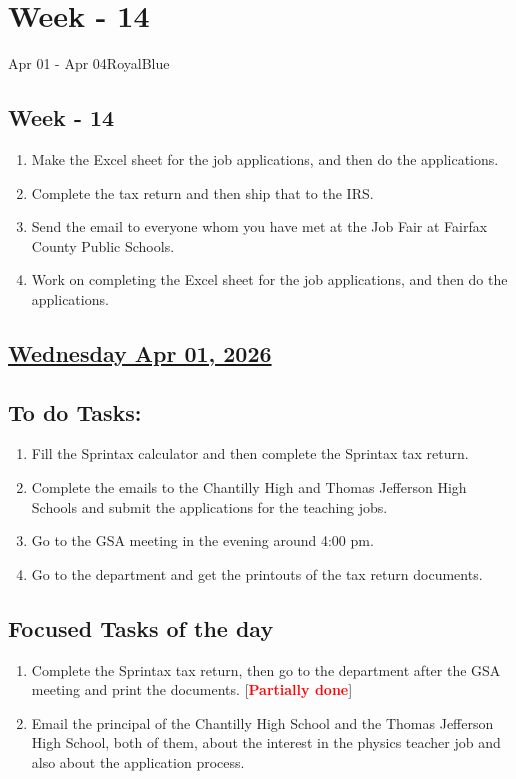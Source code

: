 \section{Week - 14}
\begin{physicsmodule}{Apr 01 - Apr 04}{RoyalBlue}
  \begin{lawbox}
    \subsection*{ Week - 14 }
    \begin{enumerate}
    \item Make the Excel sheet for the job applications, and then do the applications.
    \item Complete the tax return and then ship that to the IRS.
    \item Send the email to everyone whom you have met at the Job Fair at Fairfax County Public Schools.
    \item Work on completing the Excel sheet for the job applications, and then do the applications.
\end{enumerate}
  \end{lawbox}
\end{physicsmodule}
\subsection*{\underline{Wednesday Apr 01, 2026} }
\subsection*{To do Tasks:}
\begin{enumerate}
    \item Fill the Sprintax calculator and then complete the Sprintax tax return.
    \item Complete the emails to the Chantilly High and Thomas Jefferson High Schools and submit the applications for the teaching jobs. \xmark
    \item Go to the GSA meeting in the evening around 4:00 pm. \cmark
    \item Go to the department and get the printouts of the tax return documents.
\end{enumerate}
\subsection*{Focused Tasks of the day}
\begin{enumerate}[\ding{212}]  
    \item Complete the Sprintax tax return, then go to the department after the GSA meeting and print the documents. [\textcolor{red}{\textbf{Partially done}}]
    \item Email the principal of the Chantilly High School and the Thomas Jefferson High School, both of them, about the interest in the physics teacher job and also about the application process.\xmark
\end{enumerate}
